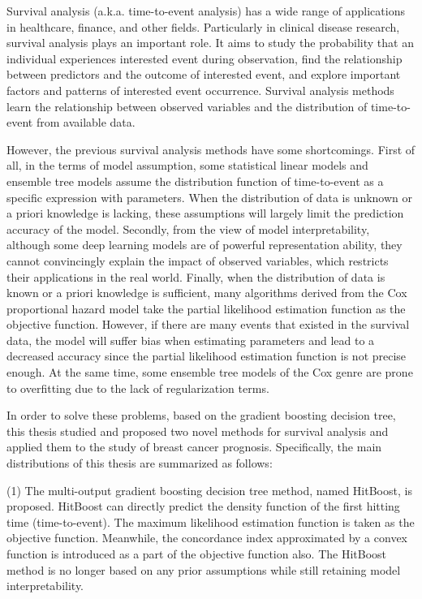 
\begin{englishabstract}
    Survival analysis (a.k.a. time-to-event analysis) has a wide range of applications in healthcare, finance, and other fields. Particularly in clinical disease research, survival analysis plays an important role. It aims to study the probability that an individual experiences interested event during observation, find the relationship between predictors and the outcome of interested event, and explore important factors and patterns of interested event occurrence. Survival analysis methods learn the relationship between observed variables and the distribution of time-to-event from available data.
	
	However, the previous survival analysis methods have some shortcomings. First of all, in the terms of model assumption, some statistical linear models and ensemble tree models assume the distribution function of time-to-event as a specific expression with parameters. When the distribution of data is unknown or a priori knowledge is lacking, these assumptions will largely limit the prediction accuracy of the model. Secondly, from the view of model interpretability, although some deep learning models are of powerful representation ability, they cannot convincingly explain the impact of observed variables, which restricts their applications in the real world. Finally, when the distribution of data is known or a priori knowledge is sufficient, many algorithms derived from the Cox proportional hazard model take the partial likelihood estimation function as the objective function. However, if there are many events that existed in the survival data, the model will suffer bias when estimating parameters and lead to a decreased accuracy since the partial likelihood estimation function is not precise enough. At the same time, some ensemble tree models of the Cox genre are prone to overfitting due to the lack of regularization terms.

    In order to solve these problems, based on the gradient boosting decision tree, this thesis studied and proposed two novel methods for survival analysis and applied them to the study of breast cancer prognosis. Specifically, the main distributions of this thesis are summarized as follows:

    (1) The multi-output gradient boosting decision tree method, named HitBoost, is proposed. HitBoost can directly predict the density function of the first hitting time (time-to-event). The maximum likelihood estimation function is taken as the objective function. Meanwhile, the concordance index approximated by a convex function is introduced as a part of the objective function also. The HitBoost method is no longer based on any prior assumptions while still retaining model interpretability.
    

\end{englishabstract}
